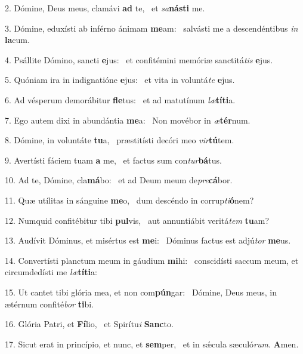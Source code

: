 2. Dómine, Deus meus, clamávi \textbf{ad} te, \ast\  et \textit{sa}\textbf{nás}\textbf{ti} me.\

3. Dómine, eduxísti ab inférno ánimam \textbf{me}am: \ast\  salvásti me a descendéntibus \textit{in} \textbf{la}cum.\

4. Psállite Dómino, sancti \textbf{e}jus: \ast\  et confitémini memóriæ sanctitá\textit{tis} \textbf{e}jus.\

5. Quóniam ira in indignatióne \textbf{e}jus: \ast\  et vita in voluntá\textit{te} \textbf{e}jus.\

6. Ad vésperum demorábitur \textbf{fle}tus: \ast\  et ad matutínum \textit{læ}\textbf{tí}\textbf{ti}a.\

7. Ego autem dixi in abundántia \textbf{me}a: \ast\  Non movébor in \textit{æ}\textbf{tér}num.\

8. Dómine, in voluntáte \textbf{tu}a, \ast\  præstitísti decóri meo \textit{vir}\textbf{tú}tem.\

9. Avertísti fáciem tuam \textbf{a} me, \ast\  et factus sum con\textit{tur}\textbf{bá}tus.\

10. Ad te, Dómine, cla\textbf{má}bo: \ast\  et ad Deum meum de\textit{pre}\textbf{cá}bor.\

11. Quæ utílitas in sánguine \textbf{me}o, \ast\  dum descéndo in corrup\textit{ti}\textbf{ó}nem?\

12. Numquid confitébitur tibi \textbf{pul}vis, \ast\  aut annuntiábit veritá\textit{tem} \textbf{tu}am?\

13. Audívit Dóminus, et misértus est \textbf{me}i: \ast\  Dóminus factus est adjú\textit{tor} \textbf{me}us.\

14. Convertísti planctum meum in gáudium \textbf{mi}hi: \ast\  conscidísti saccum meum, et circumdedísti me \textit{læ}\textbf{tí}\textbf{ti}a:\

15. Ut cantet tibi glória mea, et non com\textbf{pún}gar: \ast\  Dómine, Deus meus, in ætérnum confité\textit{bor} \textbf{ti}bi.\

16. Glória Patri, et \textbf{Fí}lio, \ast\  et Spirítu\textit{i} \textbf{Sanc}to.\

17. Sicut erat in princípio, et nunc, et \textbf{sem}per, \ast\  et in sǽcula sæculó\textit{rum}. \textbf{A}men.\

